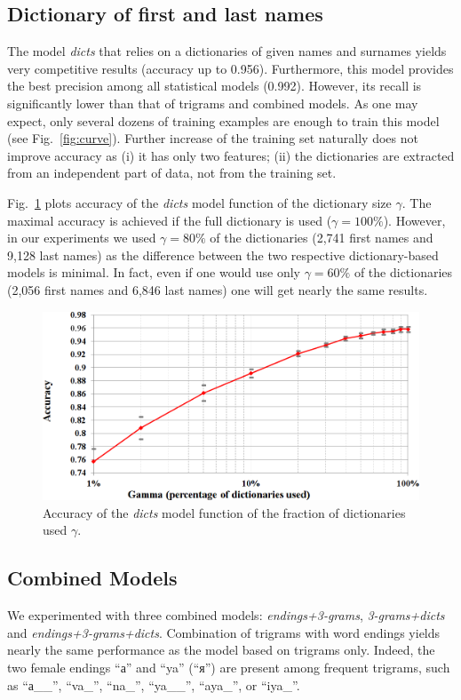 \documentclass[runningheads,a4paper]{llncs}
\newcommand\textcyr[1]{{\fontencoding{OT2}\fontfamily{wncyr}\selectfont #1}}
\begin{document}
\subsection{Dictionary of first and last names} The model \textit{dicts} that relies on a dictionaries of given names and surnames yields very competitive results (accuracy up to 0.956). Furthermore, this model provides the best precision among all statistical models (0.992). However, its recall is significantly lower than that of trigrams and combined models. As one may expect, only several dozens of training examples are enough to train this model (see Fig.~\ref{fig:curve}). Further increase of the training set naturally does not improve accuracy as (i) it has only two features; (ii) the dictionaries are extracted from an independent part of data, not from the training set. 

Fig.~\ref{fig:dict} plots accuracy of the \textit{dicts} model function of the dictionary size $\gamma$. The maximal accuracy is achieved if the full dictionary is used ($\gamma = 100\%$). However, in our experiments we used $\gamma = 80\%$ of the dictionaries (2,741 first names and 9,128 last names) as the difference between the two respective dictionary-based models is minimal. In fact, even if one would use only $\gamma = 60\%$ of the dictionaries (2,056 first names and 6,846 last names) one will get nearly the same results.   


\begin{figure}
\centering
\includegraphics[width=1.0\textwidth]{figures/dict} 
\caption{ Accuracy of the \textit{dicts} model function of the fraction of dictionaries used $\gamma$. }
\label{fig:dict}
\end{figure}

\subsection{Combined Models} We experimented with three combined models: \textit{endings+3-grams}, \textit{3-grams+dicts} and \textit{endings+3-grams+dicts}. Combination of trigrams with word endings yields nearly the same performance as the model based on trigrams only. Indeed, the two female endings ``\textcyr{а}'' and ``ya'' (``\textcyr{я}'') are present among frequent trigrams, such as ``\textcyr{а\_\_}'', ``{va\_}'', ``{na\_}'', ``{ya\_\_}'', ``{aya\_}'', or ``{iya\_}''.  
\end{document}

